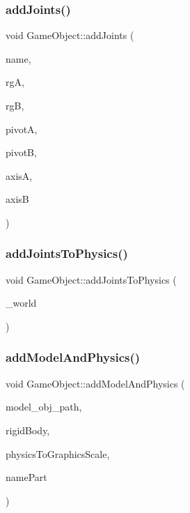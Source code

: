 \subsubsection{\texorpdfstring{add\+Joints()}{addJoints()}}
{\footnotesize\ttfamily void Game\+Object\+::add\+Joints (\begin{DoxyParamCaption}\item[{string}]{name,  }\item[{shared\+\_\+ptr$<$ \mbox{\hyperlink{class_rigidbody}{Rigidbody}} $>$ \&}]{rgA,  }\item[{shared\+\_\+ptr$<$ \mbox{\hyperlink{class_rigidbody}{Rigidbody}} $>$ \&}]{rgB,  }\item[{bt\+Vector3 \&}]{pivotA,  }\item[{bt\+Vector3 \&}]{pivotB,  }\item[{bt\+Vector3 \&}]{axisA,  }\item[{bt\+Vector3 \&}]{axisB }\end{DoxyParamCaption})}

\mbox{\label{class_game_object_a18120b85704277a48ab064138b44e9eb}} 
\subsubsection{\texorpdfstring{add\+Joints\+To\+Physics()}{addJointsToPhysics()}}
{\footnotesize\ttfamily void Game\+Object\+::add\+Joints\+To\+Physics (\begin{DoxyParamCaption}\item[{\mbox{\hyperlink{class_physics_world}{Physics\+World}} \&}]{\+\_\+world }\end{DoxyParamCaption})}

\mbox{\label{class_game_object_a35111561ee0a5dcbd260ae282fbee715}} 
\subsubsection{\texorpdfstring{add\+Model\+And\+Physics()}{addModelAndPhysics()}}
{\footnotesize\ttfamily void Game\+Object\+::add\+Model\+And\+Physics (\begin{DoxyParamCaption}\item[{const string \&}]{model\+\_\+obj\+\_\+path,  }\item[{shared\+\_\+ptr$<$ \mbox{\hyperlink{class_rigidbody}{Rigidbody}} $>$ \&}]{rigid\+Body,  }\item[{float}]{physics\+To\+Graphics\+Scale,  }\item[{string}]{name\+Part }\end{DoxyParamCaption})}

